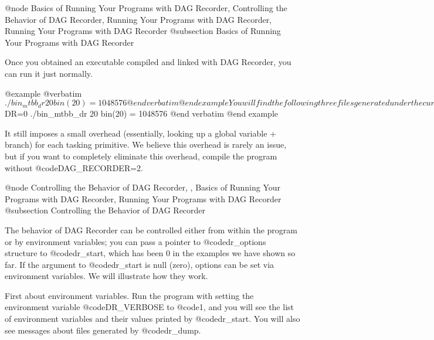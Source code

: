 @node Basics of Running Your Programs with DAG Recorder, Controlling the Behavior of DAG Recorder, Running Your Programs with DAG Recorder, Running Your Programs with DAG Recorder
@subsection Basics of Running Your Programs with DAG Recorder

Once you obtained an executable compiled and linked with DAG Recorder, you can run it just normally.  

@example 
@verbatim
$ ./bin_mtbb_dr 20
bin(20) = 1048576
@end verbatim
@end example

You will find the following three files generated under the current directory.
@itemize @bullet
@item @file{00dr.dag} --- The DAG file. This is the primary file generated by DAG Recorder, from which other files are derived
@item @file{00dr.gpl} --- The parallelism file.  This is a file showing the actual and available parallelism, in a gnuplot format. 
@item @file{00dr.stat} --- The summary stat file.  This is a text file showing, among others, the number of tasks, total work time (time spent in the application code), critical path, the number of steals, etc.  The contents of this file will be explained later.
@end itemize

Run this program with setting environment variable @code{DR=0}, and you
can run the program with DAG Recorder turned off.

@example 
@verbatim
$ DR=0 ./bin_mtbb_dr 20
bin(20) = 1048576
@end verbatim
@end example

It still imposes a small overhead (essentially, looking up a global
variable + branch) for each tasking primitive.  We believe this overhead
is rarely an issue, but if you want to completely eliminate this
overhead, compile the program without @code{DAG_RECORDER=2}.

@node Controlling the Behavior of DAG Recorder,  , Basics of Running Your Programs with DAG Recorder, Running Your Programs with DAG Recorder
@subsection Controlling the Behavior of DAG Recorder

The behavior of DAG Recorder can be controlled either from within the
program or by environment variables; you can pass a pointer to
@code{dr_options} structure to @code{dr_start}, which has been 0 in the
examples we have shown so far.  If the argument to @code{dr_start} is
null (zero), options can be set via environment variables.  We will
illustrate how they work.

First about environment variables.  Run the program with setting the
environment variable @code{DR_VERBOSE} to @code{1}, and you will see the
list of environment variables and their values printed by
@code{dr_start}.  You will also see messages about files generated by
@code{dr_dump}.


